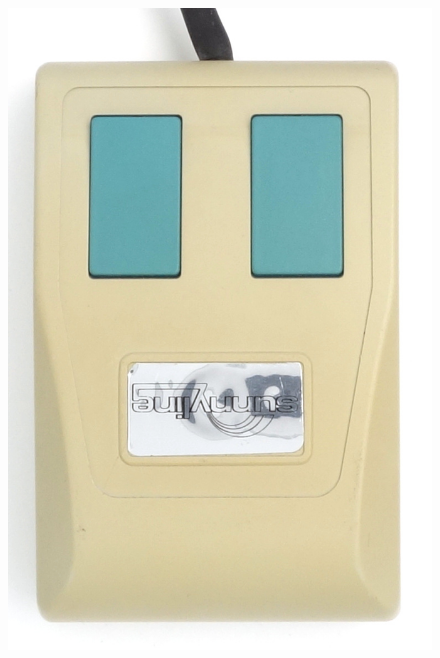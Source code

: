 \documentclass[11pt, a4paper]{article}
\begin{document}
\begin{figure}[h]
    \centering
    \includegraphics[scale=0.85]{1986_sunnyline_digimouse/top_30.jpg}

\end{figure}
\end{document}
